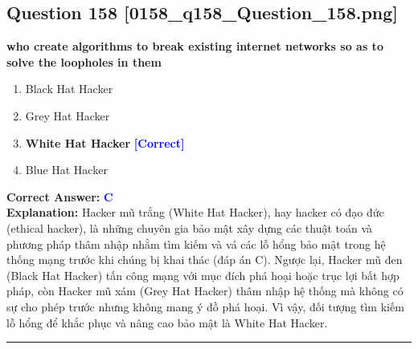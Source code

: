 \documentclass[11pt,a4paper]{article}
\begin{document}
\begin{minipage}{\textwidth}
\subsection*{Question 158 \quad \footnotesize{[0158\_q158\_Question\_158.png]}}
\noindent \textbf{who create algorithms to break existing internet networks so as to solve the loopholes in them}

\begin{enumerate}[label=\Alph*.]
    \item Black Hat Hacker
    \item Grey Hat Hacker
    \item \textbf{White Hat Hacker} \hfill \textcolor{blue}{\textbf{[Correct]}}
    \item Blue Hat Hacker
\end{enumerate}

\noindent \textbf{Correct Answer:} \textcolor{blue}{\textbf{C}} \\[2pt]
\noindent \textbf{Explanation:} Hacker mũ trắng (White Hat Hacker), hay hacker có đạo đức (ethical hacker), là những chuyên gia bảo mật xây dựng các thuật toán và phương pháp thâm nhập nhằm tìm kiếm và vá các lỗ hổng bảo mật trong hệ thống mạng trước khi chúng bị khai thác (đáp án C). Ngược lại, Hacker mũ đen (Black Hat Hacker) tấn công mạng với mục đích phá hoại hoặc trục lợi bất hợp pháp, còn Hacker mũ xám (Grey Hat Hacker) thâm nhập hệ thống mà không có sự cho phép trước nhưng không mang ý đồ phá hoại. Vì vậy, đối tượng tìm kiếm lỗ hổng để khắc phục và nâng cao bảo mật là White Hat Hacker.

\par\vspace{0.3cm}
\hrule
\vspace{0.3cm}
\end{minipage}
\end{document}

